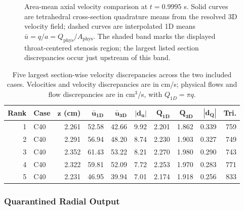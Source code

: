 \begin{figure}[H]
    \centering
    \captionsetup{aboveskip=2pt,belowskip=2pt}
    \caption{Area-mean axial velocity comparison at $t=0.9995$ s. Solid curves are
    tetrahedral cross-section quadrature means from the resolved 3D velocity
    field; dashed curves are interpolated 1D means
    $\bar u=q/a=Q_{\mathrm{phys}}/A_{\mathrm{phys}}$. The shaded band marks the
    displayed throat-centered stenosis region; the largest listed section
    discrepancies occur just upstream of this band.}
    \label{fig:t1-section-mean-comparison}
\end{figure}

\begin{table}[!htb]
    \centering
    \scriptsize
    \caption{Five largest section-wise velocity discrepancies across the two
    included cases. Velocities and velocity discrepancies are in cm/s; physical
    flows and flow discrepancies are in cm$^3$/s, with $Q_{1D}=\pi q$.}
    \label{tab:t1-largest-section-discrepancies}
    \begin{tabular}{@{}rlrrrrrrrr@{}}
        \toprule
        \textbf{Rank}
            & \textbf{Case}
            & $\boldsymbol{z}$ \textbf{(cm)}
            & $\boldsymbol{\bar u_{1D}}$
            & $\boldsymbol{\bar u_{3D}}$
            & $\boldsymbol{|d_u|}$
            & $\boldsymbol{Q_{1D}}$
            & $\boldsymbol{Q_{3D}}$
            & $\boldsymbol{|d_Q|}$
            & \textbf{Tri.} \\
        \midrule
        1 & C40 & 2.261 & 52.58 & 42.66 & 9.92 & 2.201 & 1.862 & 0.339 & 759 \\
        2 & C40 & 2.291 & 56.94 & 48.20 & 8.74 & 2.230 & 1.903 & 0.327 & 749 \\
        3 & C40 & 2.352 & 61.43 & 53.22 & 8.21 & 2.270 & 1.980 & 0.290 & 743 \\
        4 & C40 & 2.322 & 59.81 & 52.09 & 7.72 & 2.253 & 1.970 & 0.283 & 771 \\
        5 & C40 & 2.231 & 46.95 & 39.94 & 7.01 & 2.174 & 1.918 & 0.256 & 833 \\
        \bottomrule
    \end{tabular}
\end{table}

\subsubsection{Quarantined Radial Output}
\label{subsec:reconstructed-radial-profile-results}

